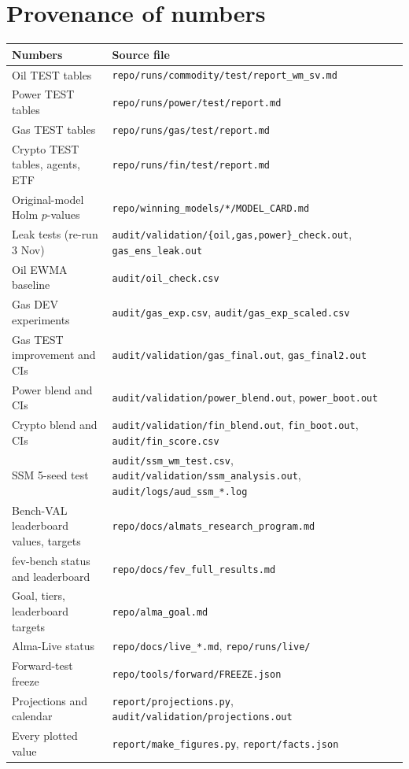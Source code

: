 \documentclass[10pt,a4paper]{article}
\newcommand{\src}[1]{{\footnotesize\texttt{#1}}}
\begin{document}
\section{Provenance of numbers}
\label{app:provenance}
\begin{longtable}{@{}p{5.2cm}p{9.6cm}@{}}
\toprule
Numbers & Source file\\
\midrule
\endhead
Oil TEST tables & \src{repo/runs/commodity/test/report\_wm\_sv.md}\\
Power TEST tables & \src{repo/runs/power/test/report.md}\\
Gas TEST tables & \src{repo/runs/gas/test/report.md}\\
Crypto TEST tables, agents, ETF & \src{repo/runs/fin/test/report.md}\\
Original-model Holm $p$-values & \src{repo/winning\_models/*/MODEL\_CARD.md}\\
Leak tests (re-run 3 Nov) & \src{audit/validation/\{oil,gas,power\}\_check.out}, \src{gas\_ens\_leak.out}\\
Oil EWMA baseline & \src{audit/oil\_check.csv}\\
Gas DEV experiments & \src{audit/gas\_exp.csv}, \src{audit/gas\_exp\_scaled.csv}\\
Gas TEST improvement and CIs & \src{audit/validation/gas\_final.out}, \src{gas\_final2.out}\\
Power blend and CIs & \src{audit/validation/power\_blend.out}, \src{power\_boot.out}\\
Crypto blend and CIs & \src{audit/validation/fin\_blend.out}, \src{fin\_boot.out}, \src{audit/fin\_score.csv}\\
SSM 5-seed test & \src{audit/ssm\_wm\_test.csv}, \src{audit/validation/ssm\_analysis.out}, \src{audit/logs/aud\_ssm\_*.log}\\
Bench-VAL leaderboard values, targets & \src{repo/docs/almats\_research\_program.md}\\
fev-bench status and leaderboard & \src{repo/docs/fev\_full\_results.md}\\
Goal, tiers, leaderboard targets & \src{repo/alma\_goal.md}\\
Alma-Live status & \src{repo/docs/live\_*.md}, \src{repo/runs/live/}\\
Forward-test freeze & \src{repo/tools/forward/FREEZE.json}\\
Projections and calendar & \src{report/projections.py}, \src{audit/validation/projections.out}\\
Every plotted value & \src{report/make\_figures.py}, \src{report/facts.json}\\
\bottomrule
\end{longtable}
\end{document}
